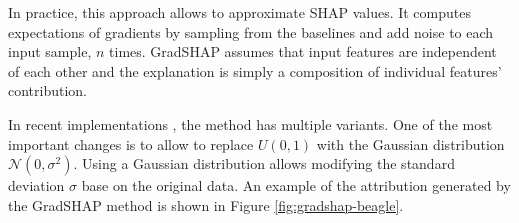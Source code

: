 In practice, this approach allows to approximate SHAP values. It computes expectations of gradients by sampling from the baselines and add noise to each input sample, $n$ times. GradSHAP assumes that input features are independent of each other and the explanation is simply a composition of individual features' contribution.

\vspace{\baselineskip}

In recent implementations \cite{kokhlikyan2020captum}, the method has multiple variants. One of the most important changes is to allow to replace $U(0,1)$ with the Gaussian distribution ${\mathcal {N}}(0 ,\sigma ^{2})$. Using a Gaussian distribution allows modifying the standard deviation $\sigma$ base on the original data. An example of the attribution generated by the GradSHAP method is shown in Figure \ref{fig:gradshap-beagle}.